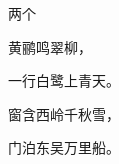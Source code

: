 \begin{minipage}[c][2.5cm][t]{2em} 两个 \end{minipage}\quad
\begin{minipage}[c][2.5cm][c]{3em} 黄鹂鸣翠柳， \end{minipage}\quad
\begin{minipage}[c][2.5cm][b]{3em} 一行白鹭上青天。 \end{minipage}\quad
\begin{minipage}[c][2.5cm][s]{4em}
\setlength\parskip{0pt plus 1pt}%
窗含西岭千秋雪，\par
门泊东吴万里船。
\end{minipage}
